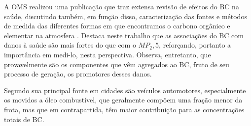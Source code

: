 A OMS realizou uma publicação que traz extensa revisão 
de efeitos do BC na saúde, discutindo também, em função disso, caracterização 
das fontes e métodos de medida das diferentes formas em que encontramos o 
carbono orgânico e elementar na atmosfera \citep{janssen2012}.
Destaca neste trabalho que as associações do BC com danos à saúde são mais 
fortes do que com o $MP_2,5$, reforçando, portanto a importância em medi-lo, 
nesta perspectiva. Observa, entretanto, que provavelmente são os componentes que
vêm agregados ao BC, fruto de seu processo de geração, os promotores desses 
danos.

Segundo \citet{petzold2013} sua principal fonte em cidades são veículos 
automotores, especialmente os movidos a óleo combustível, que geralmente compõem
uma fração menor da frota, mas que em contrapartida, têm maior 
contribuição para as concentrações totais de BC.

